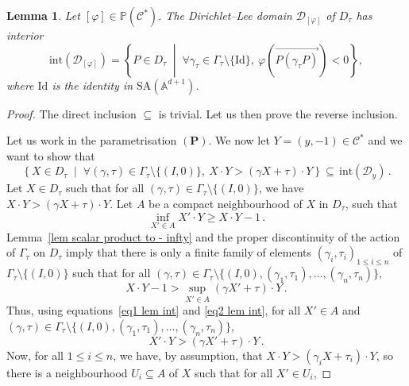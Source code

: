 \documentclass[10pt,a4paper]{amsart}
\newtheorem{lemma}{Lemma}
\newcommand{\A}{\mathbb{A}} %
\newcommand{\C}{\mathcal{C}} %
\newcommand{\DL}{\mathcal{D}} %
\newcommand{\Id}{\mathrm{Id}} %
\renewcommand{\P}{\mathbb{P}} %
\newcommand{\SA}{\mathrm{SA}} %
\newcommand{\st}{\; \middle\vert \;} %
\newcommand{\vp}[1]{{\left( {#1} \right)}} %
\begin{document}
\begin{lemma}
\label{lem int of Dirichlet--Lee domain}
Let $[\varphi]\in \P(\C^*)$. The Dirichlet--Lee domain $\DL_{[\varphi]}$ of $D_\tau$ has interior
\begin{equation*}
 \mathrm{int}(\DL_{[\varphi]}) = \left\lbrace P \in D_\tau \st \forall \gamma_\tau \in \Gamma_\tau\setminus \{\Id\}, \ \varphi\vp{\overrightarrow{P(\gamma_\tau P)}} < 0\right\rbrace ,
\end{equation*}
where $\Id$ is the identity in $\SA (\A^{d+1})$. 
\end{lemma}

\begin{proof}
The direct inclusion $\subseteq$ is trivial. Let us then prove the reverse inclusion.

Let us work in the parametrisation $(\mathbf{P})$. We now let $Y=(y,-1) \in \C^*$ and we want to show that 
\begin{equation*}
\left\lbrace X \in D_\tau \st \forall (\gamma,\tau) \in \Gamma_\tau\setminus \{(I,0)\}, \ X\cdot Y > (\gamma X + \tau ) \cdot Y\right\rbrace \subseteq \, \mathrm{int}(\DL_{y}) \,.
\end{equation*}
Let $X \in D_\tau$ such that for all $(\gamma,\tau) \in \Gamma_\tau\setminus \{(I,0)\}$, we have $X\cdot Y > (\gamma X + \tau ) \cdot Y$. Let $A$ be a compact neighbourhood of $X$ in $D_\tau$, such that 
\begin{equation}
\label{eq1 lem int}
\inf_{X' \in A} X' \cdot Y \geq X \cdot Y -1 \, . 
\end{equation}
Lemma~\ref{lem scalar product to - infty} and the proper discontinuity of the action of $\Gamma_\tau$ on $D_\tau$ imply that there is only a finite family of elements $(\gamma_i,\tau_i)_{1 \leq i \leq n}$ of $\Gamma_\tau \setminus\{(I,0)\}$ such that for all $(\gamma,\tau) \in \Gamma_\tau \setminus\{(I,0),(\gamma_1,\tau_1), \dots, (\gamma_n,\tau_n)\}$,
\begin{equation}
\label{eq2 lem int}
X \cdot Y - 1 > \sup_{X' \in A} (\gamma X' + \tau) \cdot Y \, . 
\end{equation}
Thus, using equations~\eqref{eq1 lem int} and \eqref{eq2 lem int}, for all $X' \in A$ and $(\gamma,\tau) \in \Gamma_\tau \setminus\{(I,0),(\gamma_1,\tau_1), \dots, (\gamma_n,\tau_n)\}$,
\begin{equation}
\label{eq3 lem int}
 X' \cdot Y > (\gamma X' + \tau ) \cdot Y \, . 
\end{equation}
Now, for all $1 \leq i \leq n$, we have, by assumption, that $X\cdot Y > (\gamma_i X + \tau_i ) \cdot Y$, so there is a neighbourhood $U_i \subseteq A$ of $X$ such that for all $X' \in U_i$,

\end{proof}
\end{document}
